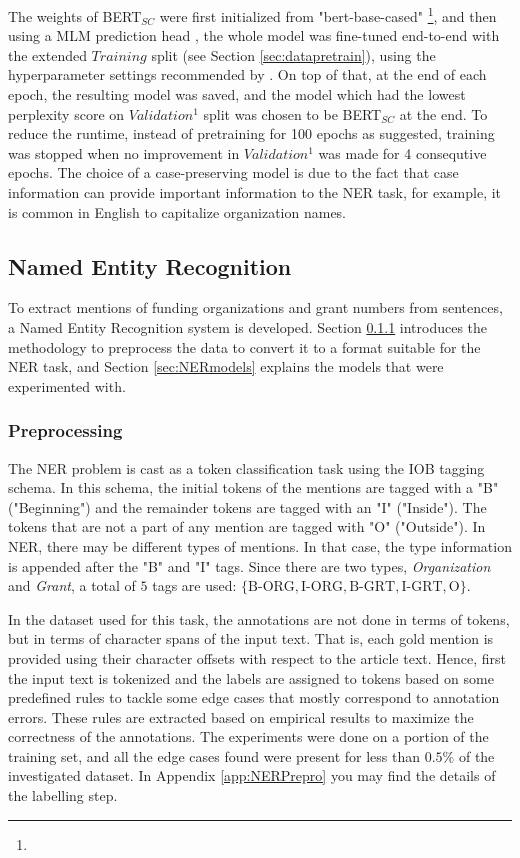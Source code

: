 \documentclass{article}
\theoremstyle{definition}
\theoremstyle{remark}
\begin{document}
The weights of BERT$_{SC}$ were first initialized from "bert-base-cased" \textcolor{red}{\footnote{}}, and then using a MLM prediction head \textcolor{red}{\cite{}}, the whole model was fine-tuned end-to-end with the extended $Training$ split (see Section \ref{sec:datapretrain}), using the hyperparameter settings recommended by \cite{DontStop}. On top of that, at the end of each epoch, the resulting model was saved, and the model which had the lowest perplexity score on $Validation^{1}$ split was chosen to be BERT$_{SC}$ at the end. To reduce the runtime, instead of pretraining for 100 epochs as suggested, training was stopped when no improvement in $Validation^{1}$ was made for 4 consequtive epochs. The choice of a case-preserving model is due to the fact that case information can provide important information to the NER task, for example, it is common in English to capitalize organization names.

\subsection{Named Entity Recognition}

To extract mentions of funding organizations and grant numbers from sentences, a Named Entity Recognition system is developed. Section \ref{sec:NERpre} introduces the methodology to preprocess the data to convert it to a format suitable for the NER task, and Section \ref{sec:NERmodels} explains the models that were experimented with.

\subsubsection{Preprocessing}
\label{sec:NERpre}
 The NER problem is cast as a token classification task using the IOB tagging schema. In this schema, the initial tokens of the mentions are tagged with a "B" ("Beginning") and the remainder tokens are tagged with an "I" ("Inside"). The tokens that are not a part of any mention are tagged with "O" ("Outside"). In NER, there may be different types of mentions. In that case, the type information is appended after the "B" and "I" tags. Since there are two types, \textit{Organization} and \textit{Grant}, a total of $5$ tags are used: $\{ \text{B-ORG}, \text{I-ORG}, \text{B-GRT}, \text{I-GRT}, \text{O} \}$.

In the dataset used for this task, the annotations are not done in terms of tokens, but in terms of character spans of the input text. That is, each gold mention is provided using their character offsets with respect to the article text. Hence, first the input text is tokenized and the labels are assigned to tokens based on some predefined rules to tackle some edge cases that mostly correspond to annotation errors. These rules are extracted based on empirical results to maximize the correctness of the annotations. The experiments were done on a portion of the training set, and all the edge cases found were present for less than $0.5\%$ of the investigated dataset. In Appendix \ref{app:NERPrepro} you may find the details of the labelling step.
\end{document}

